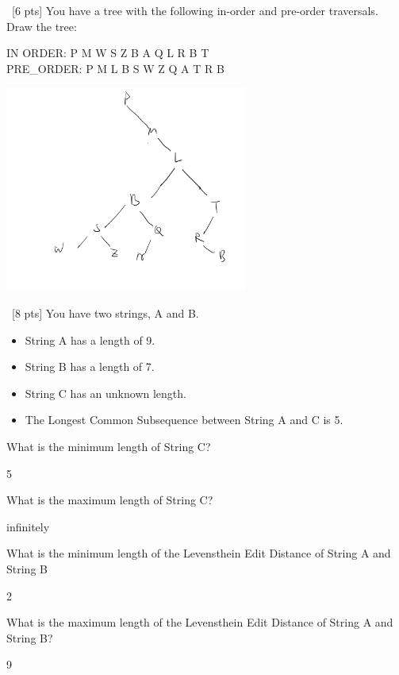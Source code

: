 \documentclass[12pt]{article}
\newenvironment{sol}[1][Solution]{\begin{trivlist}\item[\hskip\labelsep {\bfseries #1:}]}{\end{trivlist}}
\begin{document}
\begin{enumerate}
\item \ [6 pts] You have a tree with the following in-order and pre-order traversals. Draw the tree:
\begin{center}
IN ORDER: P M W S Z B A Q L R B T \\
PRE\_ORDER: P M L B S W Z Q A T R B
\end{center}
        \begin{sol}
        \hspace*{\fill}
                                    \begin{center}
    \includegraphics[width=0.6\textwidth]{p2.jpeg}
    \end{center} 
        \end{sol}


\item \ [8 pts] You have two strings, A and B.
\begin{itemize}
    \item String A has a length of 9.
    \item String B has a length of 7.
    \item String C has an unknown length.
    \item The Longest Common Subsequence between String A and C is 5.
\end{itemize}
\begin{enumerate}
    \item What is the minimum length of String C?
    \begin{sol}
        5
    \end{sol}
    \item What is the maximum length of String C?
    \begin{sol}
        infinitely
    \end{sol}
    \item What is the minimum length of the Levensthein Edit Distance of String A and String B
    \begin{sol}
        2
    \end{sol}
    \item What is the maximum length of the Levensthein Edit Distance of String A and String B?
    \begin{sol}
        9
    \end{sol}


\end{enumerate}
\end{enumerate}
\end{document}
